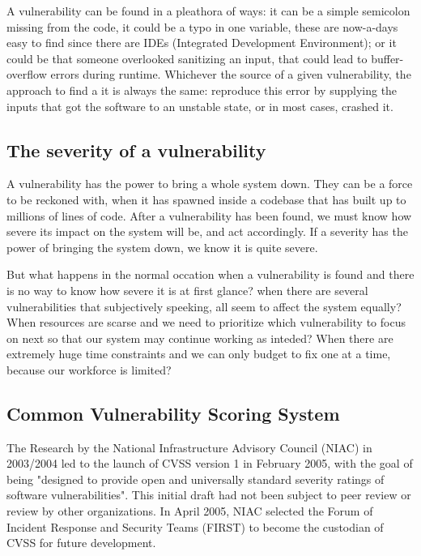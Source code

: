 A vulnerability can be found in a pleathora of ways: it can be a simple semicolon missing from the code, it could be a typo in one variable, these are now-a-days easy to find since there are IDEs (Integrated Development Environment); or it could be that someone overlooked sanitizing an input, that could lead to buffer-overflow errors during runtime. Whichever the source of a given vulnerability, the approach to find a it is always the same: reproduce this error by supplying the inputs that got the software to an unstable state, or in most cases, crashed it.

\subsection{The severity of a vulnerability}

A vulnerability has the power to bring a whole system down. They can be a force to be reckoned with, when it has spawned inside a codebase that has built up to millions of lines of code. After a vulnerability has been found, we must know how severe its impact on the system will be, and act accordingly. If a severity has the power of bringing the system down, we know it is quite severe. 

But what happens in the normal occation when a vulnerability is found and there is no way to know how severe it is at first glance? when there are several vulnerabilities that subjectively speeking, all seem to affect the system equally? When resources are scarse and we need to prioritize which vulnerability to focus on next so that our system may continue working as inteded?
When there are extremely huge time constraints and we can only budget to fix one at a time, because our workforce is limited?

\subsection{Common Vulnerability Scoring System}

The Research by the National Infrastructure Advisory Council (NIAC) in 2003/2004 led to the launch of CVSS version 1 in February 2005, with the goal of being "designed to provide open and universally standard severity ratings of software vulnerabilities". This initial draft had not been subject to peer review or review by other organizations. In April 2005, NIAC selected the Forum of Incident Response and Security Teams (FIRST) to become the custodian of CVSS for future development. 

